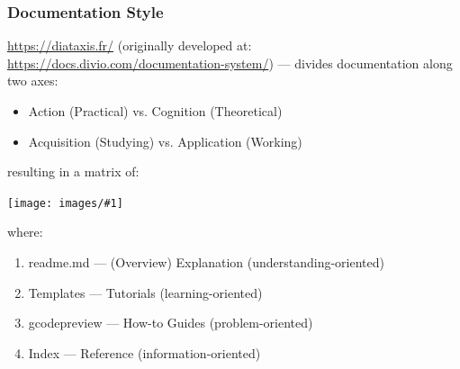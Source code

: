 \documentclass{ltxdoc}
\newcommand{\includeimage}[1]{\bigskip\noindent\texttt{[image: images/\#1]}\bigskip}
\begin{document}
%
%
%
%

\subsubsection*{Documentation Style}
 
\url{https://diataxis.fr/} (originally developed at: \url{https://docs.divio.com/documentation-system/}) --- divides documentation along two axes:

\begin{itemize}
\item Action (Practical) vs. Cognition (Theoretical)
\item Acquisition (Studying) vs. Application (Working)
\end{itemize}

\noindent resulting in a matrix of:

\includeimage{diataxis_overview.png}

\noindent where:

\begin{enumerate}
\item readme.md --- (Overview) Explanation (understanding-oriented) %
\item Templates --- Tutorials (learning-oriented)
\item gcodepreview --- How-to Guides (problem-oriented)
\item Index --- Reference (information-oriented)
\end{enumerate}
\end{document}
